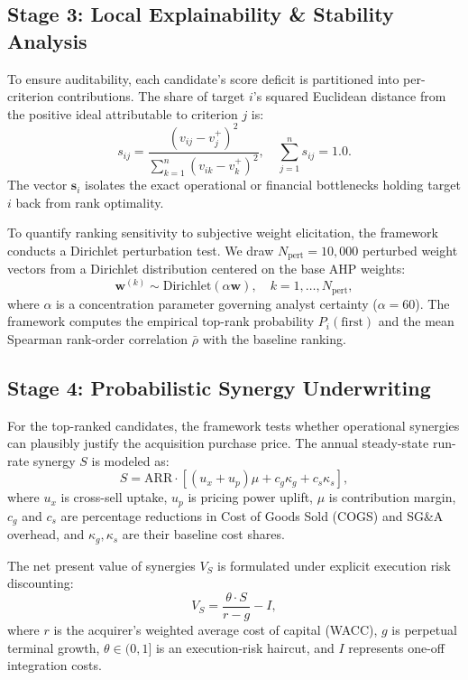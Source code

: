 \documentclass[conference]{IEEEtran}
\begin{document}
\subsection{Stage 3: Local Explainability \& Stability Analysis}
To ensure auditability, each candidate's score deficit is partitioned into per-criterion contributions. The share of target $i$'s squared Euclidean distance from the positive ideal attributable to criterion $j$ is:
\begin{equation}
s_{ij} = \frac{(v_{ij} - v_j^+)^2}{\sum_{k=1}^n (v_{ik} - v_k^+)^2}, \quad \sum_{j=1}^n s_{ij} = 1.0.
\label{eq:sij}
\end{equation}
The vector $\mathbf{s}_i$ isolates the exact operational or financial bottlenecks holding target $i$ back from rank optimality.

To quantify ranking sensitivity to subjective weight elicitation, the framework conducts a Dirichlet perturbation test. We draw $N_{\text{pert}} = 10,000$ perturbed weight vectors from a Dirichlet distribution centered on the base AHP weights:
\begin{equation}
\mathbf{w}^{(k)} \sim \mathrm{Dirichlet}(\alpha \mathbf{w}), \quad k = 1, \dots, N_{\text{pert}},
\end{equation}
where $\alpha$ is a concentration parameter governing analyst certainty ($\alpha = 60$). The framework computes the empirical top-rank probability $P_i(\text{first})$ and the mean Spearman rank-order correlation $\bar{\rho}$ with the baseline ranking.

\subsection{Stage 4: Probabilistic Synergy Underwriting}
For the top-ranked candidates, the framework tests whether operational synergies can plausibly justify the acquisition purchase price. The annual steady-state run-rate synergy $S$ is modeled as:
\begin{equation}
S = \mathrm{ARR} \cdot \left[ (u_x + u_p)\mu + c_g \kappa_g + c_s \kappa_s \right],
\end{equation}
where $u_x$ is cross-sell uptake, $u_p$ is pricing power uplift, $\mu$ is contribution margin, $c_g$ and $c_s$ are percentage reductions in Cost of Goods Sold (COGS) and SG\&A overhead, and $\kappa_g, \kappa_s$ are their baseline cost shares.

The net present value of synergies $V_S$ is formulated under explicit execution risk discounting:
\begin{equation}
V_S = \frac{\theta \cdot S}{r - g} - I,
\label{eq:vs}
\end{equation}
where $r$ is the acquirer's weighted average cost of capital (WACC), $g$ is perpetual terminal growth, $\theta \in (0, 1]$ is an execution-risk haircut, and $I$ represents one-off integration costs.
\end{document}
